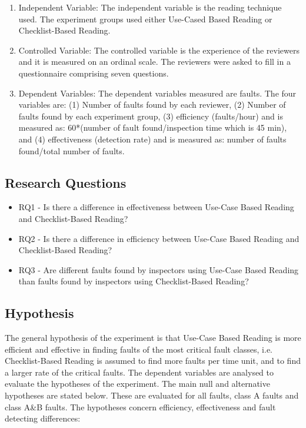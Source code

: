 \documentclass[10pt,twocolumn]{article}
\begin{document}
\begin{enumerate}[label=(\alph*)]

	\item Independent Variable: The independent variable is
	the reading technique used. The experiment groups used either
	Use-Cased Based Reading or Checklist-Based Reading.
	\item Controlled Variable: The controlled variable is the
	experience of the reviewers and it is measured on an ordinal
	scale. The reviewers were asked to fill in a questionnaire
	comprising seven questions.
	\item Dependent Variables: The dependent variables
	measured are faults. The four variables are: (1) Number of
	faults found by each reviewer, (2) Number of faults found by
	each experiment group, (3) efficiency (faults/hour) and is
	measured as: 60*(number of fault found/inspection time which
	is 45 min), and (4) effectiveness (detection rate) and is measured
	as: number of faults found/total number of faults.

\end{enumerate}

\subsection{Research Questions}
\begin{itemize}
\item RQ1 - Is there a difference in effectiveness between Use-Case Based Reading and Checklist-Based Reading?
\item RQ2 - Is there a difference in efficiency between Use-Case Based Reading and Checklist-Based Reading?
\item RQ3 - Are different faults found by inspectors using Use-Case Based Reading than faults found by inspectors using Checklist-Based Reading? 
\end{itemize}

\subsection{Hypothesis}
The general hypothesis of the experiment is that Use-Case
Based Reading is more efficient and effective in finding faults
of the most critical fault classes, i.e. Checklist-Based Reading
is assumed to find more faults per time unit, and to find a
larger rate of the critical faults.
The dependent variables are analysed to evaluate the
hypotheses of the experiment. The main null and alternative
hypotheses \cite{montgomery2008design} are stated below. These are evaluated for all
faults, class A faults and class A\&B faults. The hypotheses
concern efficiency, effectiveness and fault detecting
differences:
\end{document}
